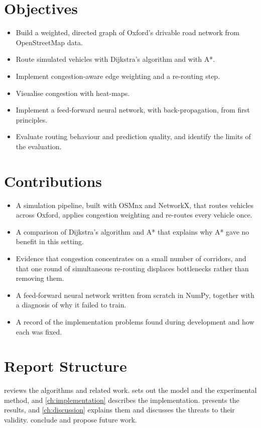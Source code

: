 \documentclass[12pt]{report}
\begin{document}
\section{Objectives}

\begin{itemize}
  \item Build a weighted, directed graph of Oxford's drivable road network from OpenStreetMap data.
  \item Route simulated vehicles with Dijkstra's algorithm and with A*.
  \item Implement congestion-aware edge weighting and a re-routing step.
  \item Visualise congestion with heat-maps.
  \item Implement a feed-forward neural network, with back-propagation, from first principles.
  \item Evaluate routing behaviour and prediction quality, and identify the limits of the evaluation.
\end{itemize}

\section{Contributions}

\begin{itemize}
  \item A simulation pipeline, built with OSMnx and NetworkX, that routes vehicles across Oxford, applies congestion weighting and re-routes every vehicle once.
  \item A comparison of Dijkstra's algorithm and A* that explains why A* gave no benefit in this setting.
  \item Evidence that congestion concentrates on a small number of corridors, and that one round of simultaneous re-routing displaces bottlenecks rather than removing them.
  \item A feed-forward neural network written from scratch in NumPy, together with a diagnosis of why it failed to train.
  \item A record of the implementation problems found during development and how each was fixed.
\end{itemize}

\section{Report Structure}

 reviews the algorithms and related work.  sets out the model and the experimental method, and \cref{ch:implementation} describes the implementation.  presents the results, and \cref{ch:discussion} explains them and discusses the threats to their validity.  conclude and propose future work.
\end{document}
